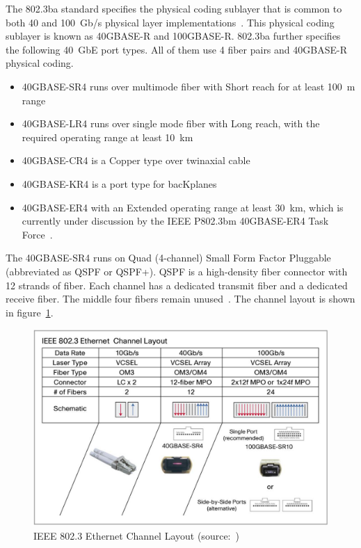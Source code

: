 The 802.3ba standard specifies the physical coding sublayer that is common to both
40 and 100~Gb/s physical layer implementations~\cite{ieee-802.3ba}.
This physical coding sublayer is known as 40GBASE-R and 100GBASE-R.
802.3ba further specifies the following 40~GbE port types.
All of them use 4 fiber pairs and 40GBASE-R physical coding.
\begin{itemize}
\item 40GBASE-SR4 runs over multimode fiber with Short reach for at least 100~m range
\item 40GBASE-LR4 runs over single mode fiber with Long reach, with the required operating range at least 10~km
\item 40GBASE-CR4 is a Copper type over twinaxial cable
\item 40GBASE-KR4 is a port type for bacKplanes
\item 40GBASE-ER4 with an Extended operating range at least 30~km, which
is currently under discussion by the IEEE P802.3bm 40GBASE-ER4 Task Force~\cite{ieee-802.3bm}.
\end{itemize}

The 40GBASE-SR4 runs on Quad (4-channel) Small Form Factor Pluggable (abbreviated as QSPF or QSPF+).
QSPF is a high-density fiber connector with 12 strands of fiber.
Each channel has a dedicated transmit fiber and a dedicated receive fiber.
The middle four fibers remain unused~\cite{cisco-market-need}.
The channel layout is shown in figure~\ref{fig:40gbe-ethernet-layout}.
\begin{figure}
	\centering
	\includegraphics[width=13cm,keepaspectratio]{fig/ethernet-layout.png}
	\caption{IEEE 802.3 Ethernet Channel Layout (source:~\cite{cisco-market-need})}
	\label{fig:40gbe-ethernet-layout}
	\bigskip
\end{figure}






